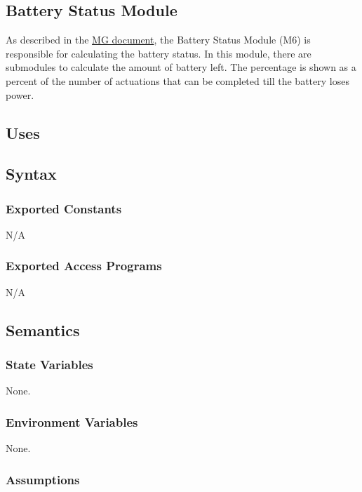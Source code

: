 \documentclass[12pt, titlepage]{article}
\begin{document}
\subsection{Battery Status Module}

As described in the \href{https://github.com/NevoAbigail/Capstone/blob/main/docs/Design/SoftArchitecture/MG.pdf}{MG document}, the Battery Status Module (M6) is responsible for calculating the battery status. In this module, there are submodules to calculate the amount of battery left. The percentage is shown as a percent of the number of actuations that can be completed till the battery loses power. 

\subsection{Uses}


\subsection{Syntax}

\subsubsection{Exported Constants}

N/A

\subsubsection{Exported Access Programs}

N/A

\subsection{Semantics}

\subsubsection{State Variables}

None.


\subsubsection{Environment Variables}

None.


\subsubsection{Assumptions}
\end{document}
